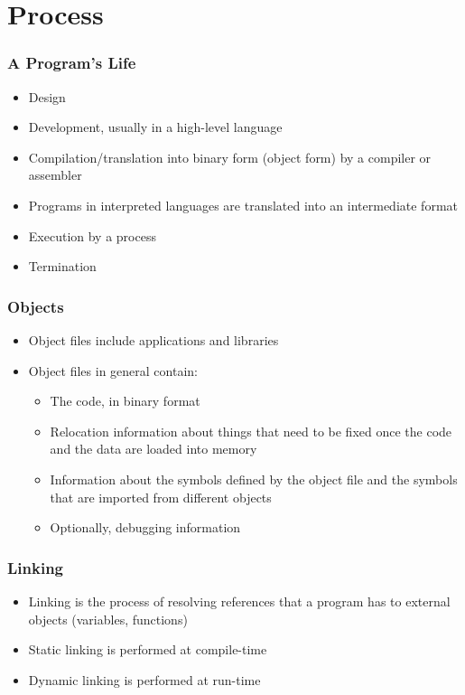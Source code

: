 \documentclass[12pt]{beamer}
\begin{document}
\section{Process}
	\begin{frame}
		\frametitle{A Program's Life}
		\begin{itemize}
			\item Design
			\item Development, usually in a high-level language
			\item Compilation/translation into binary form (object form) by a compiler or assembler
			\item Programs in interpreted languages are translated into an intermediate format
			\item Execution by a process 
			\item Termination
		\end{itemize}
	\end{frame}
	
	\begin{frame}
		\frametitle{Objects}
		\begin{itemize}
			\item Object files include applications and libraries
			\item Object files in general contain:
			\begin{itemize}
				\item The code, in binary format
				\item Relocation information about things that need to be fixed once
						the code and the data are loaded into memory
				\item Information about the symbols defined by the object file and
						the symbols that are imported from different objects
				\item Optionally, debugging information
			\end{itemize}
		\end{itemize}
	\end{frame}
	
	\begin{frame}
		\frametitle{Linking}
		\begin{itemize}
			\item Linking is the process of resolving references that a program
				has to external objects (variables, functions)
			\item Static linking is performed at compile-time
			\item Dynamic linking is performed at run-time
		\end{itemize}
	\end{frame}
	
\end{document}
